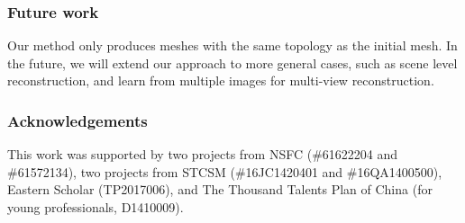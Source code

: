 \documentclass[runningheads]{llncs}
\begin{document}
\subsubsection{Future work}
Our method only produces meshes with the same topology as the initial mesh. In the future, we will extend our approach to more general cases, such as scene level reconstruction, and learn from multiple images for multi-view reconstruction.




\subsubsection{Acknowledgements}
This work was supported by two projects from NSFC (\#61622204 and \#61572134), two projects from STCSM (\#16JC1420401 and \#16QA1400500), Eastern Scholar (TP2017006),
and The Thousand Talents Plan of China (for young professionals, D1410009).
 


\end{document}
